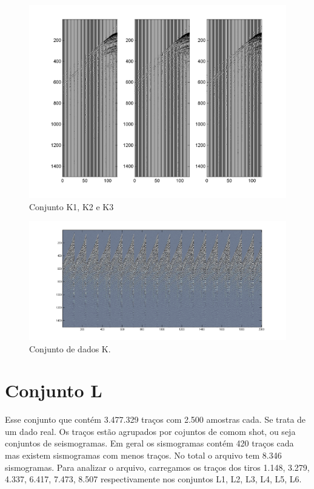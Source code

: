\begin{figure}[!h]
\centering
\includegraphics[scale=1.01]{fig/fig_K2.png}
\caption{Conjunto K1, K2 e K3}
\label{Figura:k1k2k3comp}
\end{figure}

\begin{figure}[!h]
\centering
\includegraphics[scale=1]{fig/over_img_k.png}
\caption{Conjunto de dados K.}
\label{Figura:conjuntodedadosk}
\end{figure}

\section{Conjunto L}

Esse conjunto que contém 3.477.329 traços com 2.500 amostras cada. Se trata de
um dado real. Os traços estão agrupados por cojuntos de comom shot, ou seja
conjuntos de seismogramas. Em geral os sismogramas contém 420 traços cada mas
existem sismogramas com menos traços. No total o arquivo tem 8.346 sismogramas.
Para analizar o arquivo, carregamos os traços dos tiros 1.148, 3.279, 4.337,
6.417, 7.473, 8.507 respectivamente nos conjuntos L1, L2, L3, L4, L5, L6.

